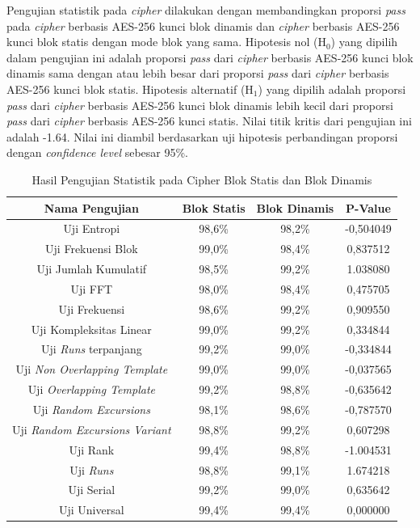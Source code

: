 Pengujian statistik pada \emph{cipher} dilakukan dengan membandingkan proporsi \emph{pass} pada \emph{cipher} berbasis AES-256 kunci blok dinamis dan \emph{cipher} berbasis AES-256 kunci blok statis dengan mode blok yang sama. Hipotesis nol ($\text{H}_0$) yang dipilih dalam pengujian ini adalah proporsi \emph{pass} dari \emph{cipher} berbasis AES-256 kunci blok dinamis sama dengan atau lebih besar dari proporsi \emph{pass} dari \emph{cipher} berbasis AES-256 kunci blok statis. Hipotesis alternatif ($\text{H}_1$) yang dipilih adalah proporsi \emph{pass} dari \emph{cipher} berbasis AES-256 kunci blok dinamis lebih kecil dari proporsi \emph{pass} dari \emph{cipher} berbasis AES-256 kunci statis. Nilai titik kritis dari pengujian ini adalah -1.64. Nilai ini diambil berdasarkan uji hipotesis perbandingan proporsi dengan \emph{confidence level} sebesar 95\%.

\begin{table}[!h]
  \centering
  \caption{Hasil Pengujian Statistik pada Cipher Blok Statis dan Blok Dinamis} \label{tab:test.statistic.cipher}
  \begin{tabular}{|c|c|c|c|}
    \hline
    \textbf{Nama Pengujian} & \textbf{Blok Statis} & \textbf{Blok Dinamis} & \textbf{P-Value} \\ \hline
    Uji Entropi & 98,6\% & 98,2\% & -0,504049 \\ \hline
    Uji Frekuensi Blok & 99,0\% & 98,4\% & 0,837512 \\ \hline
    Uji Jumlah Kumulatif & 98,5\% & 99,2\% & 1.038080 \\ \hline
    Uji FFT & 98,0\% & 98,4\% & 0,475705 \\ \hline
    Uji Frekuensi & 98,6\% & 99,2\% & 0,909550 \\ \hline
    Uji Kompleksitas Linear & 99,0\% & 99,2\% & 0,334844 \\ \hline
    Uji \emph{Runs} terpanjang & 99,2\% & 99,0\% & -0,334844 \\ \hline
    Uji \emph{Non Overlapping Template} & 99,0\% & 99,0\% & -0,037565 \\ \hline
    Uji \emph{Overlapping Template} & 99,2\% & 98,8\% & -0,635642 \\ \hline
    Uji \emph{Random Excursions} & 98,1\% & 98,6\% & -0,787570 \\ \hline
    Uji \emph{Random Excursions Variant} & 98,8\% & 99,2\% & 0,607298 \\ \hline
    Uji Rank & 99,4\% & 98,8\% & -1.004531 \\ \hline
    Uji \emph{Runs} & 98,8\% & 99,1\% & 1.674218 \\ \hline
    Uji Serial & 99,2\% & 99,0\% & 0,635642 \\ \hline
    Uji Universal & 99,4\% & 99,4\% & 0,000000 \\ \hline
  \end{tabular}
\end{table}

